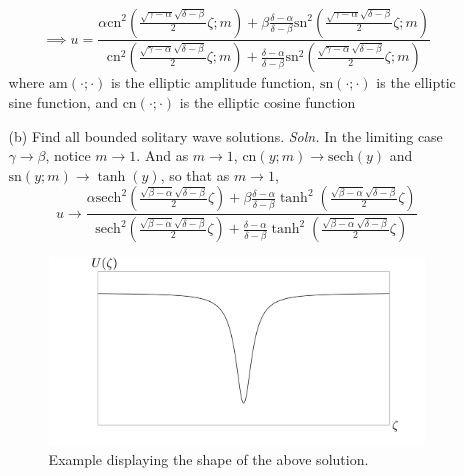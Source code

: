 \documentclass{article}
\begin{document}
\begin{itemize}
\begin{itemize}
\begin{align*}
        \end{align*}
        \[\implies u = \frac{\alpha\text{cn}^2\left(\frac{\sqrt{\gamma - \alpha}\sqrt{\delta - \beta}}{2}\zeta; m\right) + \beta\frac{\delta - \alpha}{\delta - \beta}\text{sn}^2\left(\frac{\sqrt{\gamma - \alpha}\sqrt{\delta - \beta}}{2}\zeta;m\right)}{\text{cn}^2\left(\frac{\sqrt{\gamma - \alpha}\sqrt{\delta - \beta}}{2}\zeta; m\right) + \frac{\delta - \alpha}{\delta - \beta}\text{sn}^2\left(\frac{\sqrt{\gamma - \alpha}\sqrt{\delta - \beta}}{2}\zeta;m\right)}\]
        where $\text{am}(\cdot;\cdot)$ is the elliptic amplitude function, $\text{sn}(\cdot;\cdot)$ is the elliptic sine function, and $\text{cn}(\cdot;\cdot)$ is the elliptic cosine function

        \item[(b)] Find all bounded solitary wave solutions.
        \newline\newline
        \textit{Soln.} In the limiting case $\gamma \to \beta$, notice $m \to 1$. And as $m \to 1$, $\text{cn}(y;m) \to \text{sech}(y)$ and $\text{sn}(y;m) \to \tanh(y)$, so that as $m \to 1$,
        \[u \to \frac{\alpha\text{sech}^2\left(\frac{\sqrt{\beta - \alpha}\sqrt{\delta - \beta}}{2}\zeta\right) + \beta\frac{\delta - \alpha}{\delta - \beta}\tanh^2\left(\frac{\sqrt{\beta - \alpha}\sqrt{\delta - \beta}}{2}\zeta\right)}{\text{sech}^2\left(\frac{\sqrt{\beta - \alpha}\sqrt{\delta - \beta}}{2}\zeta\right) + \frac{\delta - \alpha}{\delta - \beta}\tanh^2\left(\frac{\sqrt{\beta - \alpha}\sqrt{\delta - \beta}}{2}\zeta\right)}\]

        \begin{figure}[H]
            \centering
            \includegraphics[scale = 0.3]{soliton1_mkdv.png}
            \caption{Example displaying the shape of the above solution.}
        \end{figure}
    \end{itemize}
\end{itemize}
\end{document}
